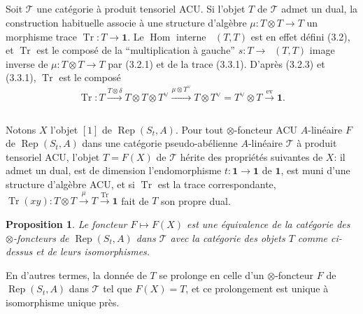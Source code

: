 \documentclass[11pt,a4paper]{article}
\theoremstyle{plain}
\newtheorem{proposition}[theorem]{Proposition}
\theoremstyle{definition}
\DeclareMathOperator{\Hom}{Hom}
\DeclareMathOperator{\Tr}{Tr}
\DeclareMathOperator{\Rep}{Rep}
\newcommand{\ev}{\mathrm{ev}}
\DeclareMathOperator{\iHom}{\underline{Hom}}
\begin{document}
\subsection{}
Soit $\mathcal{T}$ une cat\'egorie \`a produit tensoriel ACU. Si l'objet $T$ de $\mathcal{T}$ admet un dual, la construction habituelle associe \`a une structure d'alg\`ebre $\mu : T \otimes T \to T$ un morphisme trace $\Tr : T \to \mathbf{1}$. Le $\Hom$ interne $\iHom(T, T)$ est en effet d\'efini (3.2), et $\Tr$ est le compos\'e de la ``multiplication \`a gauche'' $s : T \to \iHom(T, T)$ image inverse de $\mu : T \otimes T \to T$ par (3.2.1) et de la trace (3.3.1). D'apr\`es (3.2.3) et (3.3.1), $\Tr$ est le compos\'e
\begin{equation}
\Tr : T \xrightarrow{T \otimes \delta} T \otimes T \otimes T^\vee \xrightarrow{\mu \otimes T^\vee} T \otimes T^\vee = T^\vee \otimes T \xrightarrow{\ev} \mathbf{1}. \tag{8.1.1}
\end{equation}

\subsection{}
Notons $X$ l'objet $[1]$ de $\Rep(S_t, A)$. Pour tout $\otimes$-foncteur ACU $A$-lin\'eaire $F$ de $\Rep(S_t, A)$ dans une cat\'egorie pseudo-ab\'elienne $A$-lin\'eaire $\mathcal{T}$ \`a produit tensoriel ACU, l'objet $T = F(X)$ de $\mathcal{T}$ h\'erite des propri\'et\'es suivantes de $X$: il admet un dual, est de dimension l'endomorphisme $t : \mathbf{1} \to \mathbf{1}$ de $\mathbf{1}$, est muni d'une structure d'alg\`ebre ACU, et si $\Tr$ est la trace correspondante, $\Tr(xy) : T \otimes T \xrightarrow{\mu} T \xrightarrow{\Tr} \mathbf{1}$ fait de $T$ son propre dual.

\begin{proposition}
Le foncteur $F \mapsto F(X)$ est une \'equivalence de la cat\'egorie des $\otimes$-foncteurs de $\Rep(S_t, A)$ dans $\mathcal{T}$ avec la cat\'egorie des objets $T$ comme ci-dessus et de leurs isomorphismes.
\end{proposition}

En d'autres termes, la donn\'ee de $T$ se prolonge en celle d'un $\otimes$-foncteur $F$ de $\Rep(S_t, A)$ dans $\mathcal{T}$ tel que $F(X) = T$, et ce prolongement est unique \`a isomorphisme unique pr\`es.
\end{document}
